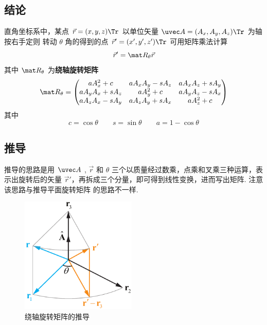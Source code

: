
\subsection{结论}
直角坐标系中，某点 $\vec r=(x,y,z)\Tr$ 以单位矢量 $\uvec A=(A_x, A_y, A_z)\Tr$ 为轴按右手定则%
转动 $\theta$ 角的得到的点 $\vec r'=(x',y',z')\Tr$ 可用矩阵乘法计算
\begin{equation}
\vec r' = \mat R_\theta \vec r
\end{equation}
其中 $\mat R_\theta$ 为\textbf{绕轴旋转矩阵}
\begin{equation}
\mat R_\theta =
\begin{pmatrix}
a A_x^2 + c & a A_x A_y - s A_z & a A_x A_z + s A_y\\
a A_y A_x + s A_z & a A_y^2 + c & a A_y A_z - s A_x\\
a A_z A_x - s A_y & a A_z A_y + s A_x & a A_z^2 + c
\end{pmatrix}\end{equation}
其中
\begin{equation}
c = \cos\theta \qquad s = \sin\theta \qquad a = 1 - \cos\theta
\end{equation}

\subsection{推导}
推导的思路是用 $\uvec A$ , $\vec r$ 和 $\theta $ 三个以质量经过数乘，点乘和叉乘三种运算，表示出旋转后的矢量 $\vec r'$，再拆成三个分量，即可得到线性变换，进而写出矩阵. 注意该思路与推导平面旋转矩阵 的思路不一样.
\begin{figure}[ht]
\centering
\includegraphics[width=5.5cm]{./figures/RotA.pdf}
\caption{绕轴旋转矩阵的推导}
\end{figure} 

